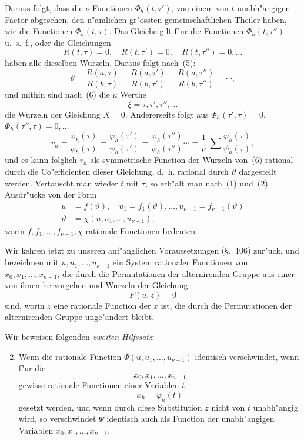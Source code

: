 \documentclass[12pt,a4paper]{article}
\theoremstyle{plain}
\begin{document}
Daraus folgt, dass die $\nu$ Functionen $\varPhi_h(t,\tau')$, von einem von $t$ unabh"angigen Factor abgesehen, den n"amlichen gr"ossten gemeinschaftlichen Theiler haben, wie die Functionen $\varPhi_h(t,\tau)$. Das Gleiche gilt f"ur die Functionen $\varPhi_h(t,\tau'')$ u.~s.~f., oder die Gleichungen
\[R(t,\tau)=0, \quad R(t,\tau')=0, \quad R(t,\tau'')=0, \ldots\]
haben alle dieselben Wurzeln. Daraus folgt nach~(5):
\[\vartheta = \frac{R(a,\tau)}{R(b,\tau)} = \frac{R(a,\tau')}{R(b,\tau')} = \frac{R(a,\tau'')}{R(b,\tau'')} = \cdots,\]
und mithin sind nach~(6) die $\mu$ Werthe
\[\xi = \tau, \tau', \tau'', \ldots\]
die Wurzeln der Gleichung $X=0$. Andererseits folgt aus $\varPhi_h(\tau',\tau)=0$, $\varPhi_h(\tau'',\tau)=0,\ldots$
\[v_h = \frac{\varphi_h(\tau)}{\psi_h(\tau)} = \frac{\varphi_h(\tau')}{\psi_h(\tau')} = \frac{\varphi_h(\tau'')}{\psi_h(\tau'')} \cdots = \frac{1}{\mu}\,\sum \frac{\varphi_h(\tau)}{\psi_h(\tau)},\]
und es kann folglich $v_h$ als symmetrische Function der Wurzeln von~(6) rational durch die Co"efficienten dieser Gleichung, d.~h. rational durch $\vartheta$ dargestellt werden. Vertauscht man wieder $t$ mit $\tau$, so erh"alt man nach~(1) und~(2) Ausdr"ucke von der Form
\begin{equation}\tag{10}
\begin{aligned}
u &= f(\vartheta), \quad u_1 = f_1(\vartheta), \ldots, u_{\nu-1} = f_{\nu-1}(\vartheta)\\
\vartheta &= \chi(u, u_1, \ldots, u_{\nu-1}),
\end{aligned}
\end{equation}
worin $f, f_1, \ldots, f_{\nu-1}, \chi$ rationale Functionen bedeuten.

\vspace{1em}
\noindent
Wir kehren jetzt zu unseren anf"anglichen Voraussetzungen (\S.~106) zur"uck, und bezeichnen mit $u, u_1, \ldots, u_{\nu-1}$ ein System rationaler Functionen von $x_0, x_1, \ldots, x_{n-1}$, die durch die Permutationen der alternirenden Gruppe aus einer von ihnen hervorgehen und Wurzeln der Gleichung
\begin{equation}\tag{1}
F(u, z) = 0
\end{equation}
sind, worin $z$ eine rationale Function der $x$ ist, die durch die Permutationen der alternirenden Gruppe unge"andert bleibt.

Wir beweisen folgenden \emph{zweiten Hilfssatz}:

\begin{enumerate}[label=\arabic*.]
\setcounter{enumi}{1}
\item Wenn die rationale Function $\Psi(u, u_1, \ldots, u_{\nu-1})$ identisch verschwindet, wenn f"ur die
\[x_0, x_1, \ldots, x_{n-1}\]
gewisse rationale Functionen einer Variablen $t$
\begin{equation}\tag{2}
x_h = \varphi_h(t)
\end{equation}
gesetzt werden, und wenn durch diese Substitution $z$ nicht von $t$ unabh"angig wird, so verschwindet $\Psi$ identisch auch als Function der unabh"angigen Variablen $x_0, x_1, \ldots, x_{\nu-1}$.
\end{enumerate}
\end{document}
